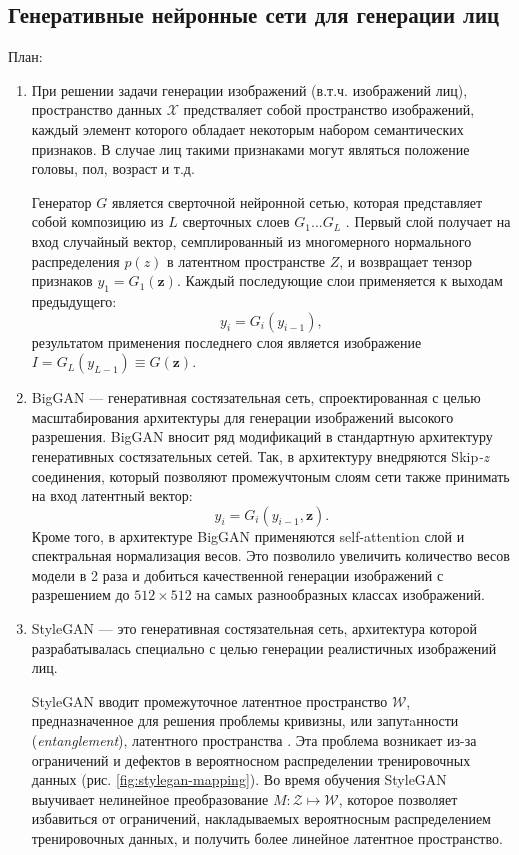 \subsection{Генеративные нейронные сети для генерации лиц}

План:

\begin{enumerate}

\item 
При решении задачи генерации изображений (в.т.ч. изображений лиц), пространство данных $\mathcal X$ предстваляет собой пространство изображений, каждый элемент которого обладает некоторым набором семантических признаков.
В случае лиц такими признаками могут являться положение головы, пол, возраст и т.д.

Генератор $G$ является сверточной нейронной сетью, которая представляет собой композицию из $L$ сверточных слоев $G_1 ... G_L$ . 
Первый слой получает на вход случайный вектор, семплированный из многомерного нормального распределения $p(z)$ в латентном пространстве $Z$, и возвращает тензор признаков $y_1 = G_1(\mathbf z)$. 
Каждый последующие слои применяется к выходам предыдущего: 
$$ y_i = G_i(y_{i-1}), $$
результатом применения последнего слоя является изображение $I = G_L(y_{L-1}) \equiv G(\mathbf z)$.


\item
%
BigGAN \cite{bigGAN} --- генеративная состязательная сеть, спроектированная с целью масштабирования архитектуры для генерации изображений высокого разрешения.
BigGAN вносит ряд модификаций в стандартную архитектуру генеративных состязательных сетей.
Так, в архитектуру внедряются Skip\emph{-z} соединения, который позволяют промежучтоным слоям сети также принимать на вход латентный вектор:
$$ y_i = G_i(y_{i-1}, \mathbf z). $$
Кроме того, в архитектуре BigGAN применяются self-attention слой и спектральная нормализация весов.
Это позволило увеличить количество весов модели в 2 раза и добиться качественной генерации изображений с разрешением до $512\times512$ на самых разнообразных классах изображений.

\item
%
StyleGAN \cite{StyleGAN} --– это генеративная состязательная сеть, архитектура которой разрабатывалась специально с целью генерации реалистичных изображений лиц.

StyleGAN вводит промежуточное латентное пространство $\mathcal W$, предназначенное для решения проблемы кривизны, или запутaнности (\emph{entanglement}), латентного пространства \cite{arvanitidis2018oddity}. 
Эта проблема возникает из-за ограничений и дефектов в вероятносном распределении тренировочных данных (рис. \ref{fig:stylegan-mapping}). 
Во время обучения StyleGAN выучивает нелинейное преобразование $M: \mathcal Z \mapsto \mathcal W$, которое позволяет избавиться от ограничений, накладываемых вероятносным распределением тренировочных данных, и получить более линейное латентное пространство.


\end{enumerate}
